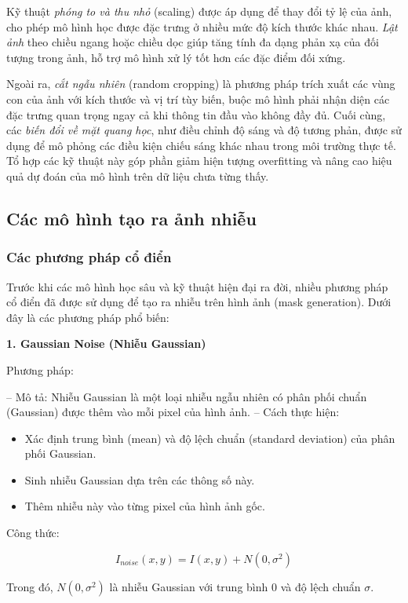 \documentclass[12pt]{report}
\begin{document}
Kỹ thuật \textit{phóng to và thu nhỏ} (scaling) được áp dụng để thay đổi tỷ lệ của ảnh, cho phép mô hình học được đặc trưng ở nhiều mức độ kích thước khác nhau. \textit{Lật ảnh} theo chiều ngang hoặc chiều dọc giúp tăng tính đa dạng phản xạ của đối tượng trong ảnh, hỗ trợ mô hình xử lý tốt hơn các đặc điểm đối xứng. 

Ngoài ra, \textit{cắt ngẫu nhiên} (random cropping) là phương pháp trích xuất các vùng con của ảnh với kích thước và vị trí tùy biến, buộc mô hình phải nhận diện các đặc trưng quan trọng ngay cả khi thông tin đầu vào không đầy đủ. Cuối cùng, các \textit{biến đổi về mặt quang học}, như điều chỉnh độ sáng và độ tương phản, được sử dụng để mô phỏng các điều kiện chiếu sáng khác nhau trong môi trường thực tế. Tổ hợp các kỹ thuật này góp phần giảm hiện tượng overfitting và nâng cao hiệu quả dự đoán của mô hình trên dữ liệu chưa từng thấy.

\subsection{Các mô hình tạo ra ảnh nhiễu}

\subsubsection{Các phương pháp cổ điển}

Trước khi các mô hình học sâu và kỹ thuật hiện đại ra đời, nhiều phương pháp cổ điển đã được sử dụng để tạo ra nhiễu trên hình ảnh (mask generation). Dưới đây là các phương pháp phổ biến:

\textbf{1. Gaussian Noise (Nhiễu Gaussian)}  

Phương pháp:  

– Mô tả: Nhiễu Gaussian là một loại nhiễu ngẫu nhiên có phân phối chuẩn (Gaussian) được thêm vào mỗi pixel của hình ảnh.  
– Cách thực hiện:
\begin{itemize}
    \item Xác định trung bình (mean) và độ lệch chuẩn (standard deviation) của phân phối Gaussian.
    \item Sinh nhiễu Gaussian dựa trên các thông số này.
    \item Thêm nhiễu này vào từng pixel của hình ảnh gốc.
\end{itemize}

Công thức:

\[
I_{noise}(x, y) = I(x, y) + N(0, \sigma^2)
\]

Trong đó, \(N(0, \sigma^2)\) là nhiễu Gaussian với trung bình 0 và độ lệch chuẩn \(\sigma\).
\end{document}
